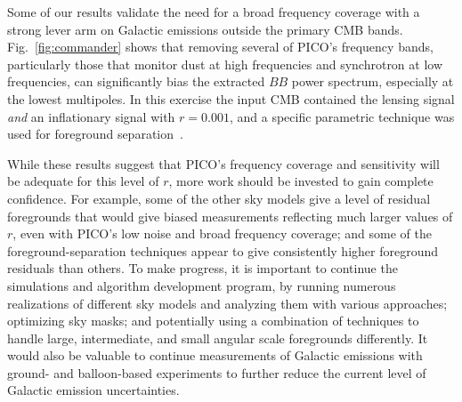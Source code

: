\documentclass[PICOReport.tex]{subfiles}
\begin{document}
Some of our results validate the need for a broad frequency coverage with a strong lever arm on Galactic emissions outside the primary CMB bands. Fig.~\ref{fig:commander} shows that removing several of PICO's frequency bands, particularly those that monitor dust at high frequencies and synchrotron at low frequencies, can significantly bias the extracted $BB$ power spectrum, especially at the lowest multipoles. In this exercise the input CMB contained the lensing signal {\it and} an inflationary signal with $r=0.001$, and a specific parametric technique was used for foreground separation~\citep{eriksen/etal:2008}. 

While these results suggest that PICO's frequency coverage and sensitivity will be adequate for this level of $r$,  more work should be invested to gain complete confidence. For example, some of the other sky models give a level of residual foregrounds that would give biased measurements reflecting much larger values of $r$, even with PICO's low noise and broad frequency coverage; and some of the foreground-separation techniques appear to give consistently higher foreground residuals than others. To make progress, it is important to continue the simulations and algorithm development program, by  running numerous realizations of different sky models and analyzing them with various approaches; optimizing sky masks; and potentially using a combination of techniques to handle large, intermediate, and small angular scale foregrounds differently. It would also be valuable to continue measurements of Galactic emissions with ground- and balloon-based experiments to further reduce the current level of Galactic emission uncertainties.  
\end{document}
